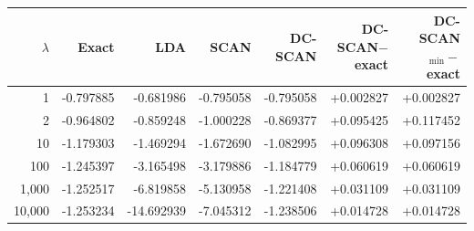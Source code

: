 \begin{tabular}{@{}rrrrrrr@{}}
\toprule
$\lambda$ & Exact & LDA & SCAN & DC-SCAN & DC-SCAN$-$exact & DC-SCAN$_{\min}-$exact \\
\midrule
1 & -0.797885 & -0.681986 & -0.795058 & -0.795058 & +0.002827 & +0.002827 \\
2 & -0.964802 & -0.859248 & -1.000228 & -0.869377 & +0.095425 & +0.117452 \\
10 & -1.179303 & -1.469294 & -1.672690 & -1.082995 & +0.096308 & +0.097156 \\
100 & -1.245397 & -3.165498 & -3.179886 & -1.184779 & +0.060619 & +0.060619 \\
1,000 & -1.252517 & -6.819858 & -5.130958 & -1.221408 & +0.031109 & +0.031109 \\
10,000 & -1.253234 & -14.692939 & -7.045312 & -1.238506 & +0.014728 & +0.014728 \\
\bottomrule
\end{tabular}
